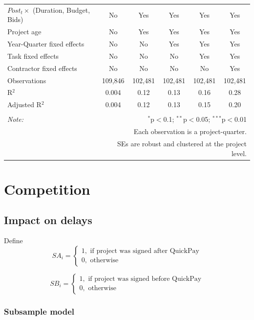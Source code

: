 \documentclass[
]{article}
\begin{document}
\begin{table}[H]
\begin{tabular}{@{\extracolsep{-2pt}}lccccc}
$Post_t \times $  (Duration, Budget, Bids) & No & Yes & Yes & Yes & Yes \\ 
Project age & No & Yes & Yes & Yes & Yes \\ 
Year-Quarter fixed effects & No & No & Yes & Yes & Yes \\ 
Task fixed effects & No & No & No & Yes & Yes \\ 
Contractor fixed effects & No & No & No & No & Yes \\ 
Observations & 109,846 & 102,481 & 102,481 & 102,481 & 102,481 \\ 
R$^{2}$ & 0.004 & 0.12 & 0.13 & 0.16 & 0.28 \\ 
Adjusted R$^{2}$ & 0.004 & 0.12 & 0.13 & 0.15 & 0.20 \\ 
\hline 
\hline \\[-1.8ex] 
\textit{Note:}  & \multicolumn{5}{r}{$^{*}$p$<$0.1; $^{**}$p$<$0.05; $^{***}$p$<$0.01} \\ 
 & \multicolumn{5}{r}{Each observation is a project-quarter.} \\ 
 & \multicolumn{5}{r}{SEs are robust and clustered at the project level.} \\ 
\end{tabular} 
\end{table}

\hypertarget{competition}{%
\section{Competition}\label{competition}}

\hypertarget{impact-on-delays}{%
\subsection{Impact on delays}\label{impact-on-delays}}

Define
\[ SA_i = \begin{cases} 1, \text{ if project was signed after QuickPay}\\
0, \text{ otherwise} \end{cases}\]

\[ SB_i = \begin{cases} 1, \text{ if project was signed before QuickPay}\\
0, \text{ otherwise} \end{cases}\]

\hypertarget{subsample-model}{%
\subsubsection{Subsample model}\label{subsample-model}}
\end{document}
